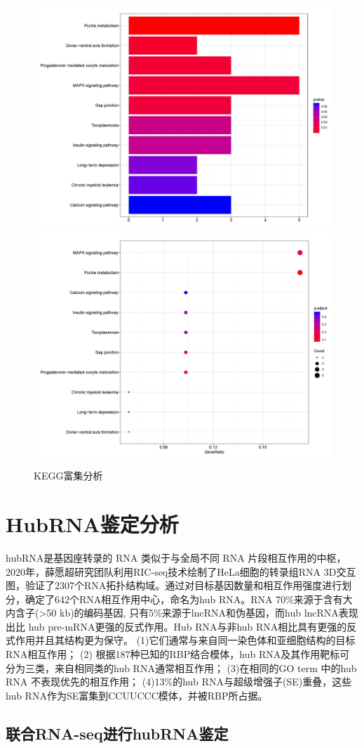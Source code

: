 \documentclass[
]{ctexart}
\begin{document}
\begin{figure}[H]

{\centering \includegraphics[width=0.48\linewidth]{./1.picture/TVSC_for_cluster_geneKEGGbar} \includegraphics[width=0.48\linewidth]{./1.picture/TVSC_for_cluster_geneKEGGdot} 

}

\caption{KEGG富集分析}\label{fig:unnamed-chunk-12}
\end{figure}

\hypertarget{hubrnaux9274ux5b9aux5206ux6790}{%
\section{HubRNA鉴定分析}\label{hubrnaux9274ux5b9aux5206ux6790}}

hubRNA是基因座转录的 RNA 类似于与全局不同 RNA 片段相互作用的中枢，2020年，薛愿超研究团队利用RIC-seq技术绘制了HeLa细胞的转录组RNA 3D交互图，验证了2307个RNA拓扑结构域。通过对目标基因数量和相互作用强度进行划分，确定了642个RNA相互作用中心，命名为hub RNA。RNA 70\%来源于含有大内含子(\textgreater50 kb)的编码基因, 只有5\%来源于lncRNA和伪基因，而hub lncRNA表现出比 hub pre-mRNA更强的反式作用。Hub RNA与非hub RNA相比具有更强的反式作用并且其结构更为保守。
(1)它们通常与来自同一染色体和亚细胞结构的目标RNA相互作用；
(2) 根据187种已知的RBP结合模体，hub RNA及其作用靶标可分为三类，来自相同类的hub RNA通常相互作用；
(3)在相同的GO term 中的hub RNA 不表现优先的相互作用；
(4)13\%的hub RNA与超级增强子(SE)重叠，这些hub RNA作为SE富集到CCUUCCC模体，并被RBP所占据。

\hypertarget{ux8054ux5408rna-sequx8fdbux884chubrnaux9274ux5b9a}{%
\subsection{联合RNA-seq进行hubRNA鉴定}\label{ux8054ux5408rna-sequx8fdbux884chubrnaux9274ux5b9a}}
\end{document}
